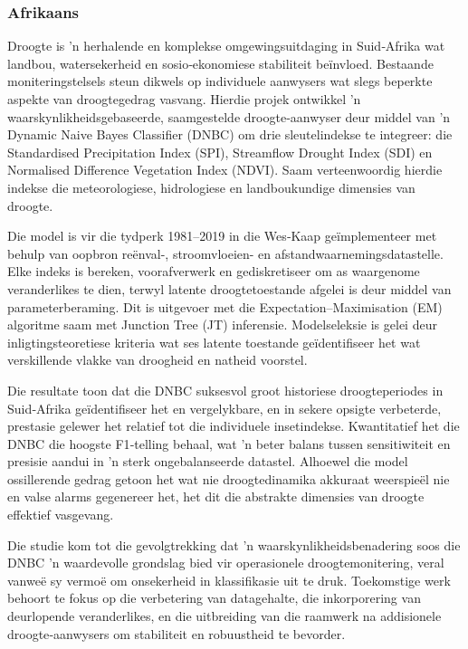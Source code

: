 
\subsubsection*{Afrikaans}

Droogte is ’n herhalende en komplekse omgewingsuitdaging in Suid‐Afrika wat landbou, watersekerheid en sosio‐ekonomiese stabiliteit beïnvloed. Bestaande moniteringstelsels steun dikwels op individuele aanwysers wat slegs beperkte aspekte van droogtegedrag vasvang. Hierdie projek ontwikkel ’n waarskynlikheidsgebaseerde, saamgestelde droogte‐aanwyser deur middel van ’n Dynamic Naive Bayes Classifier (DNBC) om drie sleutelindekse te integreer: die Standardised Precipitation Index (SPI), Streamflow Drought Index (SDI) en Normalised Difference Vegetation Index (NDVI). Saam verteenwoordig hierdie indekse die meteorologiese, hidrologiese en landboukundige dimensies van droogte.

Die model is vir die tydperk 1981–2019 in die Wes‐Kaap geïmplementeer met behulp van oopbron reënval-, stroomvloeien- en afstandwaarnemingsdatastelle. Elke indeks is bereken, voorafverwerk en gediskretiseer om as waargenome veranderlikes te dien, terwyl latente droogtetoestande afgelei is deur middel van parameterberaming. Dit is uitgevoer met die Expectation–Maximisation (EM) algoritme saam met Junction Tree (JT) inferensie. Modelseleksie is gelei deur inligtingsteoretiese kriteria wat ses latente toestande geïdentifiseer het wat verskillende vlakke van droogheid en natheid voorstel.

Die resultate toon dat die DNBC suksesvol groot historiese droogteperiodes in Suid‐Afrika geïdentifiseer het en vergelykbare, en in sekere opsigte verbeterde, prestasie gelewer het relatief tot die individuele insetindekse. Kwantitatief het die DNBC die hoogste F1‐telling behaal, wat ’n beter balans tussen sensitiwiteit en presisie aandui in ’n sterk ongebalanseerde datastel. Alhoewel die model ossillerende gedrag getoon het wat nie droogtedinamika akkuraat weerspieël nie en valse alarms gegenereer het, het dit die abstrakte dimensies van droogte effektief vasgevang.

Die studie kom tot die gevolgtrekking dat ’n waarskynlikheidsbenadering soos die DNBC ’n waardevolle grondslag bied vir operasionele droogtemonitering, veral vanweë sy vermoë om onsekerheid in klassifikasie uit te druk. Toekomstige werk behoort te fokus op die verbetering van datagehalte, die inkorporering van deurlopende veranderlikes, en die uitbreiding van die raamwerk na addisionele droogte‐aanwysers om stabiliteit en robuustheid te bevorder.


